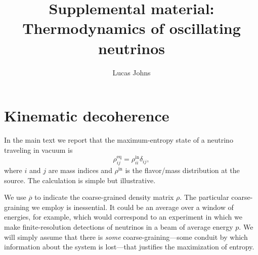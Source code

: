 \documentclass[aps,prd,twocolumn,groupedaddress]{revtex4-2}
\begin{document}

\title{Supplemental material: Thermodynamics of oscillating neutrinos}


\author{Lucas Johns}








\maketitle

\renewcommand{\theequation}{S.\arabic{equation}}





\section{Kinematic decoherence}

In the main text we report that the maximum-entropy state of a neutrino traveling in vacuum is
\begin{equation}
\rho^\textrm{eq}_{ij} = \rho^\textrm{in}_{ii} \delta_{ij}, \label{eq:vacanswer}
\end{equation}
where $i$ and $j$ are mass indices and $\rho^\textrm{in}$ is the flavor/mass distribution at the source. The calculation is simple but illustrative.

We use $\overline{\rho}$ to indicate the coarse-grained density matrix $\rho$. The particular coarse-graining we employ is inessential. It could be an average over a window of energies, for example, which would correspond to an experiment in which we make finite-resolution detections of neutrinos in a beam of average energy $p$. We will simply assume that there is \textit{some} coarse-graining---some conduit by which information about the system is lost---that justifies the maximization of entropy.
\end{document}
